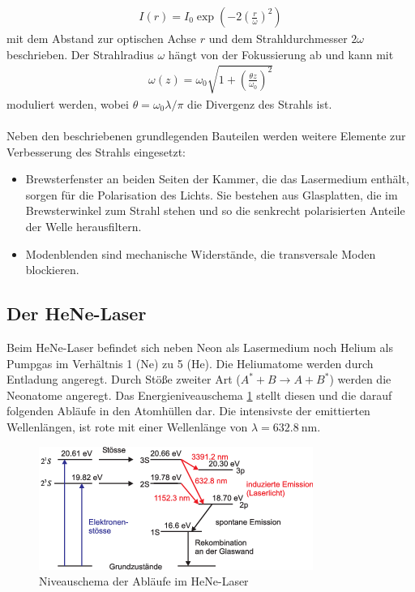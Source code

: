 \begin{align}
	I(r) = I_0\exp\left(-2\left(\frac{r}{\omega}\right)^2\right)
\end{align}
mit dem Abstand zur optischen Achse $r$ und dem Strahldurchmesser $2\omega$ beschrieben. Der Strahlradius $\omega$ hängt von der Fokussierung ab und kann mit
\begin{align}
	\omega(z) = \omega_0\sqrt{1+\left(\frac{\theta z}{\omega_0}\right)^2}
\end{align}
moduliert werden, wobei $\theta = \omega_0\lambda\slash\pi$ die Divergenz des Strahls ist. \\
\ \\
Neben den beschriebenen grundlegenden Bauteilen werden weitere Elemente zur Verbesserung des Strahls eingesetzt:
\begin{itemize}
	\item Brewsterfenster an beiden Seiten der Kammer, die das Lasermedium enthält, sorgen für die Polarisation des Lichts. Sie bestehen aus Glasplatten, die im Brewsterwinkel zum Strahl stehen und so die senkrecht polarisierten Anteile der Welle herausfiltern.
	\item Modenblenden sind mechanische Widerstände, die transversale Moden blockieren.
\end{itemize}
\subsection{Der HeNe-Laser}
Beim HeNe-Laser befindet sich neben Neon als Lasermedium noch Helium als Pumpgas im Verhältnis 1 (Ne) zu 5 (He). Die Heliumatome werden durch Entladung angeregt. Durch Stöße zweiter Art ($A^* + B \rightarrow A + B^*$) werden die Neonatome angeregt. Das Energieniveauschema \ref{fig:Niveaus} stellt diesen und die darauf folgenden Abläufe in den Atomhüllen dar. Die intensivste der emittierten Wellenlängen, ist rote mit einer Wellenlänge von $\lambda = \SI{632.8}{\nano\metre}$.
\begin{figure}[h!]
	\centering
	\includegraphics[width=.6\textwidth]{Niveauschema.png}
	\caption{Niveauschema der Abläufe im HeNe-Laser \cite{Niveaus}}
	\label{fig:Niveaus}
\end{figure}